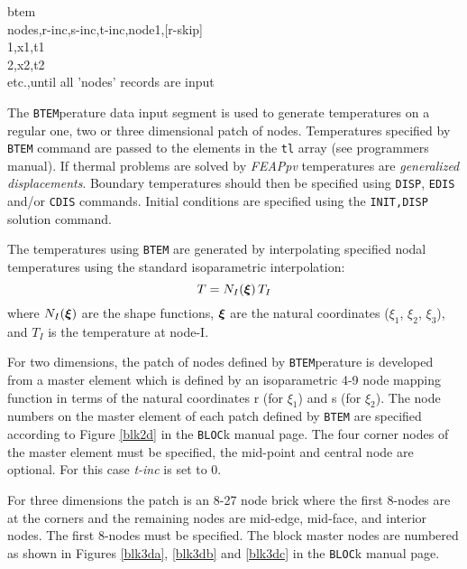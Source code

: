 \hspace{1.0cm} {{ btem \hfill}} \\{\smallskip}
\hspace{1.4cm} {{ nodes,r-inc,s-inc,t-inc,node1,[r-skip] \hfill}} \\{\smallskip}
\hspace{1.8cm} {{ 1,x1,t1 \hfill}} \\{\smallskip}
\hspace{1.8cm} {{ 2,x2,t2 \hfill}} \\{\smallskip}
\hspace{1.4cm} {{ etc.,until all 'nodes' records are input \hfill}}
\headb

The {\tt BTEM}perature data input segment is used to generate temperatures
on a regular one, two or three dimensional patch
of nodes.  Temperatures specified by {\tt BTEM} command are passed
to the elements in the {\tt tl} array (see programmers manual).
If thermal problems are solved by {\sl FEAPpv} temperatures are {\it generalized
displacements}. Boundary temperatures should then be specified using {\tt DISP},
{\tt EDIS} and/or {\tt CDIS} commands.  Initial conditions are specified using
the {\tt INIT,DISP} solution command.

The temperatures using {\tt BTEM} are generated by
interpolating specified nodal temperatures using the standard
isoparametric interpolation:
$$
T = N_I ( \boldsymbol{\xi} ) \,T_I
$$
where $N_I ( \boldsymbol{\xi} )$ are the shape functions, $\boldsymbol{\xi}$ are the natural
coordinates ($\xi_1$, $\xi_2$, $\xi_3$), and $T_I$ is the temperature at node-I.

For two dimensions, the patch of nodes defined by
{\tt BTEM}perature is developed from a master element which is defined
by an isoparametric 4-9 node mapping function in terms of
the natural coordinates r (for $\xi_1$) and s (for $\xi_2$).
The node numbers on
the master element of each patch defined by {\tt BTEM} are
specified according to Figure \ref{blk2d} in the {\tt BLOC}k manual page.
The four
corner nodes of the master element must be specified, the
mid-point and central node are optional.  For this case {\it t-inc}
is set to 0.

For three dimensions the patch is an 8-27 node brick
where the first 8-nodes are at the corners and the remaining
nodes are mid-edge, mid-face, and interior nodes.  The first
8-nodes must be specified. The block master nodes are numbered as shown in
Figures \ref{blk3da}, \ref{blk3db} and \ref{blk3dc} in the {\tt BLOC}k manual
page.

